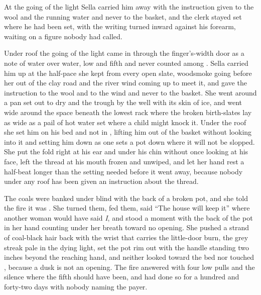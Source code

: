 At the going of the light Sella carried him away with the instruction given to the wool and the running water and never to the basket, and the clerk stayed set where he had been set, with the writing turned inward against his forearm, waiting on a figure nobody had called.

\scenebreak

Under  roof the going of the light came in through the finger's-width door as a note of water over water, low and fifth and never counted among . Sella carried him up at the half-pace she kept from every open slate, woodsmoke going before her out of the clay road and the river wind coming up to meet it, and gave the instruction to the wool and to the wind and never to the basket. She went around a pan set out to dry and the trough by the well with its skin of ice, and went wide around the space beneath the lowest rack where the broken birth-slates lay as wide as a pail of hot water set where a child might knock it. Under the roof she set him on his bed and not in , lifting him out of the basket without looking into it and setting him down as one sets a pot down where it will not be slopped. She put the fold right at his ear and under his chin without once looking at his face, left the thread at his mouth frozen and unwiped, and let her hand rest a half-beat longer than the setting needed before it went away, because nobody under any roof has been given an instruction about the thread.

The coals were banked under blind  with the back of a broken pot, and she told the fire it was . She turned them, fed them, said “The house will keep it” where another woman would have said \emph{I}, and stood a moment with the back of the pot in her hand counting under her breath toward no opening. She pushed a strand of coal-black hair back with the wrist that carries the little-door burn, the grey streak pale in the dying light, set the pot rim out with the handle standing two inches beyond the reaching hand, and neither looked toward the bed nor touched , because a dusk is not an opening. The fire answered with four low pulls and the silence where the fifth should have been, and had done so for a hundred and forty-two days with nobody naming the payer.


